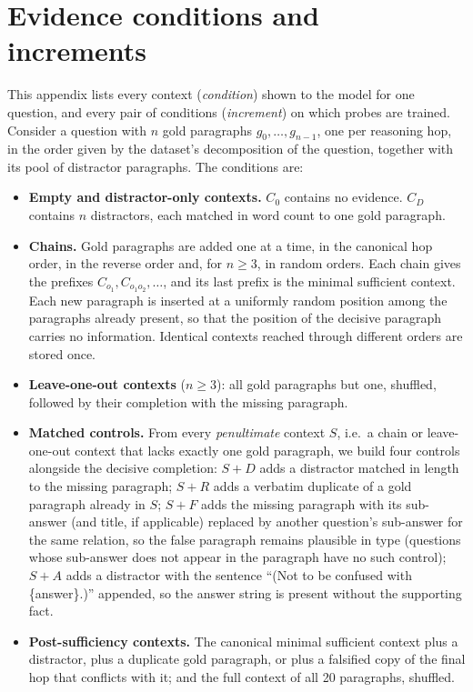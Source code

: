 \section{Evidence conditions and increments}
\label{app:conditions}
This appendix lists every context (\emph{condition}) shown to the model for one question, and every pair of conditions (\emph{increment}) on which probes are trained. Consider a question with $n$ gold paragraphs $g_0,\dots,g_{n-1}$, one per reasoning hop, in the order given by the dataset's decomposition of the question, together with its pool of distractor paragraphs. The conditions are:
\begin{itemize}
  \item \textbf{Empty and distractor-only contexts.} $C_0$ contains no evidence. $C_D$ contains $n$ distractors, each matched in word count to one gold paragraph.
  \item \textbf{Chains.} Gold paragraphs are added one at a time, in the canonical hop order, in the reverse order and, for $n\ge3$, in random orders. Each chain gives the prefixes $C_{o_{1}},C_{o_{1}o_{2}},\dots$, and its last prefix is the minimal sufficient context. Each new paragraph is inserted at a uniformly random position among the paragraphs already present, so that the position of the decisive paragraph carries no information. Identical contexts reached through different orders are stored once.
  \item \textbf{Leave-one-out contexts} ($n\ge3$): all gold paragraphs but one, shuffled, followed by their completion with the missing paragraph.
  \item \textbf{Matched controls.} From every \emph{penultimate} context $S$, i.e.\ a chain or leave-one-out context that lacks exactly one gold paragraph, we build four controls alongside the decisive completion:
  $S{+}D$ adds a distractor matched in length to the missing paragraph;
  $S{+}R$ adds a verbatim duplicate of a gold paragraph already in $S$;
  $S{+}F$ adds the missing paragraph with its sub-answer (and title, if applicable) replaced by another question's sub-answer for the same relation, so the false paragraph remains plausible in type (questions whose sub-answer does not appear in the paragraph have no such control);
  $S{+}A$ adds a distractor with the sentence ``(Not to be confused with \{answer\}.)'' appended, so the answer string is present without the supporting fact.
  \item \textbf{Post-sufficiency contexts.} The canonical minimal sufficient context plus a distractor, plus a duplicate gold paragraph, or plus a falsified copy of the final hop that conflicts with it; and the full context of all 20 paragraphs, shuffled.
\end{itemize}
